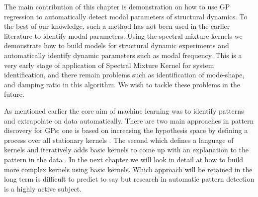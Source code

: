 The main contribution of this chapter is demonstration on how to use GP regression to automatically detect modal parameters of structural dynamics. To the best of our knowledge, such a method has not been used in the earlier literature to identify modal parameters. Using the spectral mixture kernels we demonstrate how to build models for structural dynamic experiments and automatically identify dynamic parameters such as modal frequency. This is a very early stage of application of Spectral Mixture Kernel for system identification, and there remain problems such as identification of mode-shape, and damping ratio in this algorithm. We wish to tackle these problems in the future. 

As mentioned earlier the core aim of machine learning was to identify patterns and extrapolate on data automatically. There are two main approaches in pattern discovery for GPs; one is based on increasing the hypothesis space by defining a process over all stationary kernels \cite{wilson2012process}. The second which defines a language of kernels and iteratively adds basic kernels to come up with an explanation to the pattern in the data \cite{lloyd2014automatic}. In the next chapter we will look in detail at how to build more complex kernels using basic kernels. Which approach will be retained in the long term is difficult to predict to say but research in automatic pattern detection is a highly active subject. 


